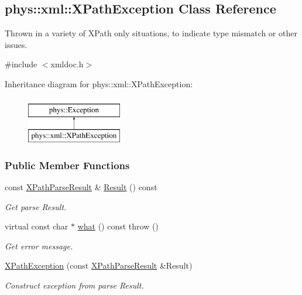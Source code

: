 \hypertarget{classphys_1_1xml_1_1XPathException}{
\subsection{phys::xml::XPathException Class Reference}
\label{classphys_1_1xml_1_1XPathException}
}


Thrown in a variety of XPath only situations, to indicate type mismatch or other issues.  




{\ttfamily \#include $<$xmldoc.h$>$}

Inheritance diagram for phys::xml::XPathException:\begin{figure}[H]
\begin{center}
\leavevmode
\includegraphics[height=2.000000cm]{classphys_1_1xml_1_1XPathException}
\end{center}
\end{figure}
\subsubsection*{Public Member Functions}
\begin{DoxyCompactItemize}
\item 
const \hyperlink{structphys_1_1xml_1_1XPathParseResult}{XPathParseResult} \& \hyperlink{classphys_1_1xml_1_1XPathException_a5410a12f705cbbc006175c08872b5749}{Result} () const 
\begin{DoxyCompactList}\small\item\em Get parse Result. \item\end{DoxyCompactList}\item 
virtual const char $\ast$ \hyperlink{classphys_1_1xml_1_1XPathException_ab16319369cd5f40990300b1b22b8f6cb}{what} () const   throw ()
\begin{DoxyCompactList}\small\item\em Get error message. \item\end{DoxyCompactList}\item 
\hypertarget{classphys_1_1xml_1_1XPathException_a39d6511632945aa46b63e80f5364e959}{
\hyperlink{classphys_1_1xml_1_1XPathException_a39d6511632945aa46b63e80f5364e959}{XPathException} (const \hyperlink{structphys_1_1xml_1_1XPathParseResult}{XPathParseResult} \&Result)}
\label{classphys_1_1xml_1_1XPathException_a39d6511632945aa46b63e80f5364e959}

\begin{DoxyCompactList}\small\item\em Construct exception from parse Result. \item\end{DoxyCompactList}\end{DoxyCompactItemize}


